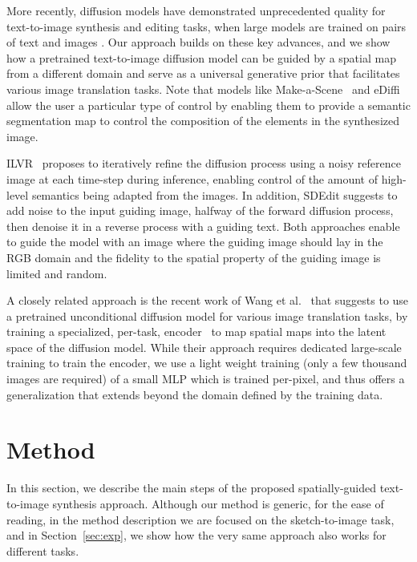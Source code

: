 More recently, diffusion models have demonstrated unprecedented quality for text-to-image synthesis and editing tasks, when large models are trained on pairs of text and images \cite{ramesh2022hierarchical,saharia2022photorealistic,rombach2021highresolution,ruiz2022dreambooth,hertz2022prompt}. Our approach builds on these key advances, and we show how a pretrained text-to-image diffusion model can be guided by a spatial map from a different domain and serve as a universal generative prior that facilitates various image translation tasks. Note that models like Make-a-Scene~\cite{gafni2022make} and eDiffi~\cite{balaji2022ediffi} allow the user a particular type of control by enabling them to provide a semantic segmentation map to control the composition of the elements in the synthesized image.

ILVR~\cite{choi2021ilvr} proposes to iteratively refine the diffusion process using a noisy reference image at each time-step during inference, enabling control of the amount of high-level semantics being adapted from the images. In addition, SDEdit \cite{meng2021sdedit} suggests to add noise to the input guiding image, halfway of the forward diffusion process, then denoise it in a reverse process with a guiding text. Both approaches enable to guide the model with an image where the guiding image should lay in the RGB domain and the fidelity to the spatial property of the guiding image is limited and random.

A closely related approach is the recent work of Wang et al.~\cite{PITI22}  that suggests to use a pretrained unconditional diffusion model for various image translation tasks, by training a specialized, per-task, encoder~\cite{richardson2020encoding} to map spatial maps into the latent space of the diffusion model. While their approach requires dedicated large-scale training to train the encoder, we use a light weight training (only a few thousand images are required) of a small MLP which is trained per-pixel, and thus offers a generalization that extends beyond the domain defined by the training data.

\section{Method}
\label{sec:method}

In this section, we describe the main steps of the proposed spatially-guided text-to-image synthesis approach. Although our method is generic, for the ease of reading, in the method description we are focused on the sketch-to-image task, and in Section~\ref{sec:exp}, we show how the very same approach also works for different tasks. 

